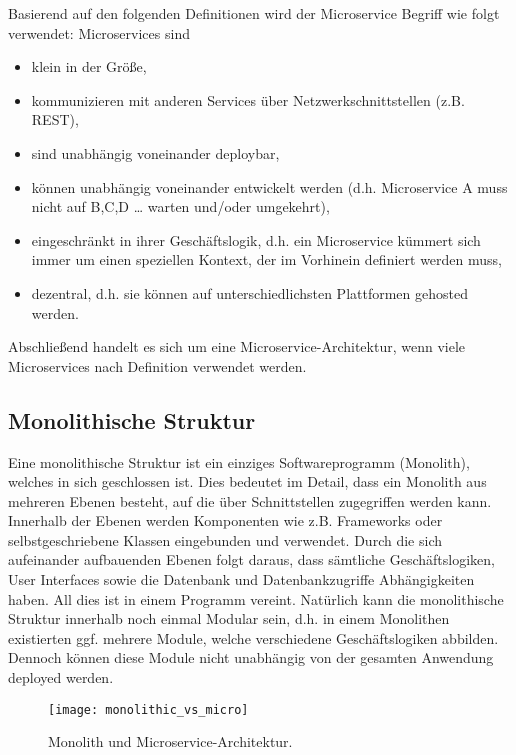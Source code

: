 Basierend auf den folgenden Definitionen wird der Microservice Begriff wie folgt verwendet: Microservices sind
\begin{itemize}
	\item klein in der Größe,
	\item kommunizieren mit anderen Services über Netzwerkschnittstellen (z.B. REST),
	\item sind unabhängig voneinander deploybar,
	\item können unabhängig voneinander entwickelt werden (d.h. Microservice A muss nicht auf B,C,D … warten und/oder umgekehrt),    
	\item eingeschränkt in ihrer Geschäftslogik, d.h. ein Microservice kümmert sich immer um einen speziellen Kontext, der im Vorhinein definiert werden muss,
	\item dezentral, d.h. sie können auf unterschiedlichsten Plattformen gehosted werden.
\end{itemize}

Abschließend handelt es sich um eine Microservice-Architektur, wenn viele Microservices nach Definition verwendet werden. 

\subsection{Monolithische Struktur }

Eine monolithische Struktur ist ein einziges Softwareprogramm (Monolith), welches in sich geschlossen ist. Dies bedeutet im Detail, dass ein Monolith aus mehreren Ebenen besteht, auf die über Schnittstellen zugegriffen werden kann. Innerhalb der Ebenen werden Komponenten wie z.B. Frameworks oder selbstgeschriebene Klassen eingebunden und verwendet.\cite{msfussell2017azure} Durch die sich aufeinander aufbauenden Ebenen folgt daraus, dass sämtliche Geschäftslogiken, User Interfaces sowie die Datenbank und Datenbankzugriffe Abhängigkeiten haben. All dies ist in einem Programm vereint.\cite{msfussell2017azure} Natürlich kann die monolithische Struktur innerhalb noch einmal Modular sein, d.h. in einem Monolithen existierten ggf. mehrere Module, welche verschiedene Geschäftslogiken abbilden. Dennoch können diese Module nicht unabhängig von der gesamten Anwendung deployed werden.\cite{nhiem2017mic_moving}

\begin{figure}[ht]
	\centering
	\texttt{[image: monolithic\_vs\_micro]}
	\caption[Monolith und Microservice-Architektur] {Monolith und Microservice-Architektur.\cite{msfussell2017azure}}
	\label{fig:mono}
\end{figure}

